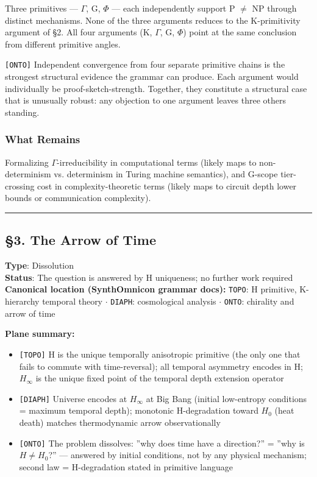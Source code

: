 \documentclass[12pt,a4paper]{article}
\newcommand{\pilcrow}{\S}
\begin{document}
Three primitives --- $\Gamma$, G, $\Phi$ --- each independently support P $\neq$ NP through distinct mechanisms. None of the three arguments reduces to the K-primitivity argument of \pilcrow{}2. All four arguments (K, $\Gamma$, G, $\Phi$) point at the same conclusion from different primitive angles.

\texttt{{[}ONTO{]}} Independent convergence from four separate primitive chains is the strongest structural evidence the grammar can produce. Each argument would individually be proof-sketch-strength. Together, they constitute a structural case that is unusually robust: any objection to one argument leaves three others standing.

\subsubsection{What Remains}

Formalizing $\Gamma$-irreducibility in computational terms (likely maps to non-determinism vs. determinism in Turing machine semantics), and G-scope tier-crossing cost in complexity-theoretic terms (likely maps to circuit depth lower bounds or communication complexity).

\begin{center}
\rule{0.5\textwidth}{0.4pt}
\end{center}

\subsection{\pilcrow{}3. The Arrow of Time}

\textbf{Type}: Dissolution   \\
\textbf{Status}: The question is answered by H uniqueness; no further work required   \\
\textbf{Canonical location (SynthOmnicon grammar docs):} \texttt{TOPO}: H primitive, K-hierarchy temporal theory $\cdot$ \texttt{DIAPH}: cosmological analysis $\cdot$ \texttt{ONTO}: chirality and arrow of time

\textbf{Plane summary:}

\begin{itemize}
    \item \texttt{{[}TOPO{]}} H is the unique temporally anisotropic primitive (the only one that fails to commute with time-reversal); all temporal asymmetry encodes in H; $H_{\infty}$ is the unique fixed point of the temporal depth extension operator
    \item \texttt{{[}DIAPH{]}} Universe encodes at $H_{\infty}$ at Big Bang (initial low-entropy conditions = maximum temporal depth); monotonic H-degradation toward $H_0$ (heat death) matches thermodynamic arrow observationally
    \item \texttt{{[}ONTO{]}} The problem dissolves: ''why does time have a direction?'' = ''why is $H \neq H_0$?'' --- answered by initial conditions, not by any physical mechanism; second law = H-degradation stated in primitive language
\end{itemize}
\end{document}
